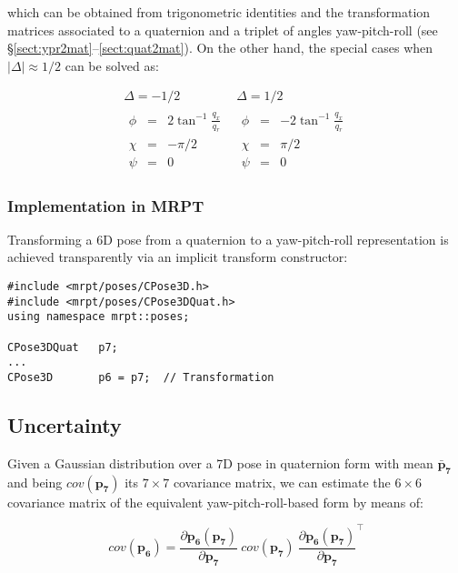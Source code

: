 \documentclass[a4paper,11pt]{report}
\begin{document}
\noindent which can be obtained from trigonometric identities and
the transformation matrices associated to a quaternion and a triplet of angles yaw-pitch-roll
(see \S \ref{sect:ypr2mat}--\ref{sect:quat2mat}).
On the other hand, the special cases when $|\Delta| \approx 1/2$ can be solved as:

\begin{equation}
\begin{array}{c|c}
  \Delta = -1/2 & \Delta = 1/2 \\ \hline
  \begin{array}{rcl}
    \phi &=& 2 \tan^{-1} \frac{q_x}{q_r} \\
    \chi &=& -\pi /2 \\
    \psi &=& 0
  \end{array}
&
  \begin{array}{rcl}
    \phi &=& -2 \tan^{-1} \frac{q_x}{q_r} \\
    \chi &=& \pi /2 \\
    \psi &=& 0
  \end{array}
\end{array}
\label{eq:quat2ypr_2}
\end{equation}


\subsubsection{Implementation in MRPT}

Transforming a 6D pose from a quaternion to a yaw-pitch-roll representation is
achieved transparently via an implicit transform constructor:

\begin{lstlisting}
#include <mrpt/poses/CPose3D.h>
#include <mrpt/poses/CPose3DQuat.h>
using namespace mrpt::poses;

CPose3DQuat   p7;
...
CPose3D       p6 = p7;  // Transformation
\end{lstlisting}


\subsection{Uncertainty}

Given a Gaussian distribution over a 7D pose in quaternion form with
mean ${\mathbf{\bar{p}_7}}$ and being $cov(\mathbf{p_7})$ its $7 \times 7$ covariance matrix,
we can estimate the $6 \times 6$ covariance matrix of the equivalent yaw-pitch-roll-based
form by means of:

\begin{equation}
cov(\mathbf{p_6}) =
\frac{\partial \mathbf{p_6}(\mathbf{p_7}) }{\partial \mathbf{p_7}} ~
cov(\mathbf{p_7})  ~
\frac{\partial \mathbf{p_6}(\mathbf{p_7}) }{\partial \mathbf{p_7}}^\top
\end{equation}
\end{document}
